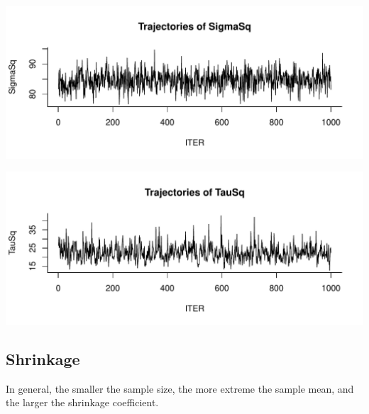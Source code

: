 \documentclass[12pt,letterpaper]{article}\usepackage[]{graphicx}\usepackage[]{color}
\makeatletter
\def\maxwidth{ %
  \ifdim\Gin@nat@width>\linewidth
    \linewidth
  \else
    \Gin@nat@width
  \fi
}
\newenvironment{knitrout}{}{} %
\makeatother
\begin{document}
\begin{knitrout}
\includegraphics[width=\maxwidth]{figure/unnamed-chunk-2-3} 

\includegraphics[width=\maxwidth]{figure/unnamed-chunk-2-4} 

\end{knitrout}

\subsection{Shrinkage}

In general, the smaller the sample size, the more extreme the sample mean, and the larger the shrinkage coefficient. 
\end{document}
